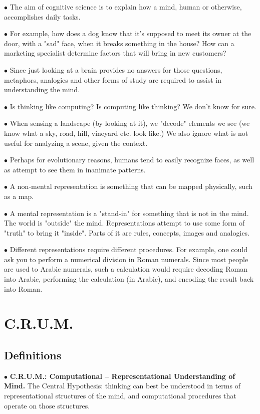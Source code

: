\documentclass[english,openany]{book}
\begin{document}
$\bullet$ The aim of cognitive science is to explain how a mind, human or otherwise, accomplishes daily tasks.

$\bullet$ For example, how does a dog know that it's supposed to meet its owner at the door, with a "sad" face, when it breaks something in the house? How can a marketing specialist determine factors that will bring in new customers?

$\bullet$ Since just looking at a brain provides no answers for those questions, metaphors, analogies and other forms of study are required to assist in understanding the mind.

$\bullet$ Is thinking like computing? Is computing like thinking? We don't know for sure.

$\bullet$ When sensing a landscape (by looking at it), we "decode" elements we see (we know what a sky, road, hill, vineyard etc. look like.) We also ignore what is not useful for analyzing a scene, given the context.

$\bullet$ Perhaps for evolutionary reasons, humans tend to easily recognize faces, as well as attempt to see them in inanimate patterns.

$\bullet$ A non-mental representation is something that can be mapped physically, such as a map.

$\bullet$ A mental representation is a "stand-in" for something that is not in the mind. The world is "outside" the mind. Representations attempt to use some form of "truth" to bring it "inside". Parts of it are rules, concepts, images and analogies.

$\bullet$ Different representations require different procedures. For example, one could ask you to perform a numerical division in Roman numerals. Since most people are used to Arabic numerals, such a calculation would require decoding Roman into Arabic, performing the calculation (in Arabic), and encoding the result back into Roman.\\

\section{C.R.U.M.}

\subsection{Definitions}

$\bullet$ \textbf{C.R.U.M.: Computational -- Representational Understanding of Mind.} The Central Hypothesis: thinking can best be understood in terms of representational structures of the mind, and computational procedures that operate on those structures.
\end{document}

